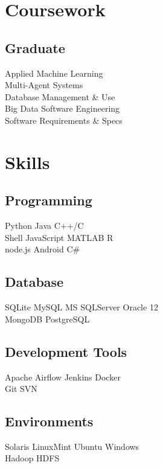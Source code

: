 \documentclass[]{Vishnu-Resume}
\begin{document}
\begin{minipage}[t]{0.33\textwidth}

\section{Coursework}
\subsection{Graduate}
Applied Machine Learning\\
Multi-Agent Systems\\
Database Management & Use\\
Big Data Software Engineering\\
Software Requirements & Specs\\
\sectionsep


\section{Skills}
\subsection{Programming}
Python \textbullet{} Java \textbullet{} C++/C\\
Shell \textbullet{} JavaScript \textbullet{} MATLAB \textbullet{} R\\ \textbullet{} node.js \textbullet{} Android \textbullet{} C\#
\sectionsep

\subsection{Database}
SQLite \textbullet{} MySQL \textbullet{} MS SQLServer \textbullet{} Oracle 12\\
MongoDB \textbullet{} PostgreSQL
\sectionsep

\subsection{Development Tools}
Apache Airflow \textbullet{} Jenkins \textbullet{} Docker \\ \textbullet{} Git \textbullet{} SVN
\sectionsep

\subsection{Environments}
Solaris \textbullet{} LinuxMint \textbullet{} Ubuntu \textbullet{} Windows\\ 
\textbullet{} Hadoop HDFS
%
%

\end{minipage} 
\end{document}
